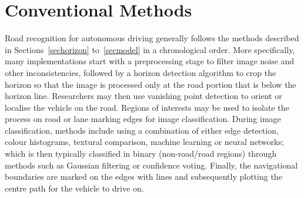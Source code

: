 \section{Conventional Methods} \label{secalgo}
Road recognition for autonomous driving generally follows the methods described in Sections~\ref{sechorizon} to~\ref{secmodel} in a chronological order. More specifically, many implementations start with a preprocessing stage to filter image noise and other inconsistencies, followed by a horizon detection algorithm to crop the horizon so that the image is processed only at the road portion that is below the horizon line. Researchers may then use vanishing point detection to orient or localise the vehicle on the road. Regions of interests may be used to isolate the process on road or lane marking edges for image classification. During image classification, methods include using a combination of either edge detection, colour histograms, textural comparison, machine learning or neural networks; which is then typically classified in binary (non-road/road regions) through methods such as Gaussian filtering or confidence voting. Finally, the navigational boundaries are marked on the edges with lines and subsequently plotting the centre path for the vehicle to drive on.

